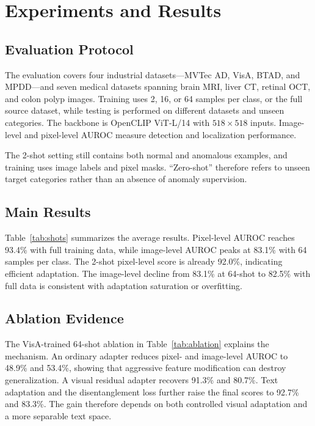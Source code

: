 \documentclass[a4paper,10pt]{article}
\begin{document}
\section{Experiments and Results}

\subsection{Evaluation Protocol}

The evaluation covers four industrial datasets---MVTec AD, VisA, BTAD, and MPDD---and seven medical datasets spanning brain MRI, liver CT, retinal OCT, and colon polyp images. Training uses 2, 16, or 64 samples per class, or the full source dataset, while testing is performed on different datasets and unseen categories. The backbone is OpenCLIP ViT-L/14 with $518\times518$ inputs. Image-level and pixel-level AUROC measure detection and localization performance.

The 2-shot setting still contains both normal and anomalous examples, and training uses image labels and pixel masks. ``Zero-shot'' therefore refers to unseen target categories rather than an absence of anomaly supervision.

\subsection{Main Results}

Table~\ref{tab:shots} summarizes the average results. Pixel-level AUROC reaches 93.4\% with full training data, while image-level AUROC peaks at 83.1\% with 64 samples per class. The 2-shot pixel-level score is already 92.0\%, indicating efficient adaptation. The image-level decline from 83.1\% at 64-shot to 82.5\% with full data is consistent with adaptation saturation or overfitting.

\subsection{Ablation Evidence}

The VisA-trained 64-shot ablation in Table~\ref{tab:ablation} explains the mechanism. An ordinary adapter reduces pixel- and image-level AUROC to 48.9\% and 53.4\%, showing that aggressive feature modification can destroy generalization. A visual residual adapter recovers 91.3\% and 80.7\%. Text adaptation and the disentanglement loss further raise the final scores to 92.7\% and 83.3\%. The gain therefore depends on both controlled visual adaptation and a more separable text space.
\end{document}
